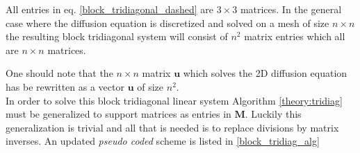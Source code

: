 \noindent All entries in eq. \eqref{block_tridiagonal_dashed} are $3\times3$ matrices. 
In the general case where the diffusion equation is discretized and solved on a mesh of size $n\times n$ the resulting block tridiagonal system will consist of $n^2$ matrix entries which all are $n\times n$ matrices.
% 
% 

One should note that the $n\times n$ matrix $\mathbf u$ which solves the 2D diffusion equation has be rewritten as a vector $\mathbf{u}$ of size $n^2$. \\ 

In order to solve this block tridiagonal linear system Algorithm \ref{theory:tridiag} must be generalized to support matrices as entries in $\mathbf M$. 
Luckily this generalization is trivial and all that is needed is to replace divisions by matrix inverses. 
An updated \emph{pseudo coded} scheme is listed in \eqref{block_tridiag_alg}

